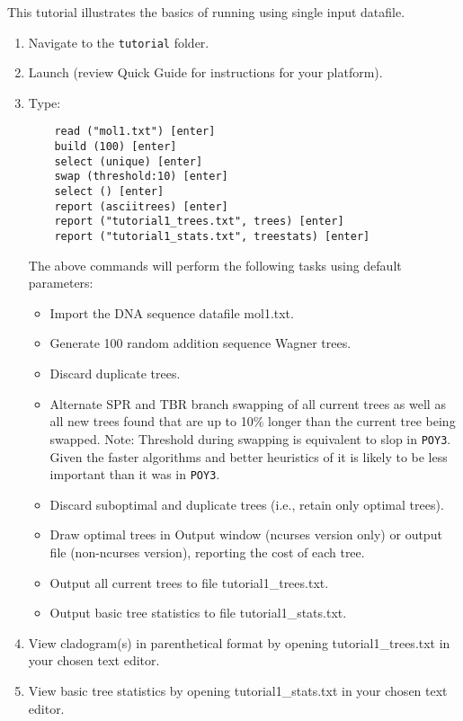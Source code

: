 This tutorial illustrates the basics of running \poy using single input datafile. 
\begin{enumerate}
\item Navigate to the \texttt{tutorial} folder. 
\item Launch \poy (review \poy Quick Guide for instructions for your platform).
\item Type:

    \begin{verbatim}
    read ("mol1.txt") [enter]
    build (100) [enter]
    select (unique) [enter]
    swap (threshold:10) [enter]
    select () [enter]
    report (asciitrees) [enter]
    report ("tutorial1_trees.txt", trees) [enter]
    report ("tutorial1_stats.txt", treestats) [enter]
    \end{verbatim}

The above commands will perform the following tasks using default parameters:
\begin{itemize}
\item  Import the DNA sequence datafile mol1.txt.
\item  Generate 100 random addition sequence Wagner trees.
\item  Discard duplicate trees.
\item  Alternate SPR and TBR branch swapping of all current trees as well as all 
new trees found that are up to 10\%
longer than the current tree being 
swapped. Note: Threshold during swapping is equivalent to slop in \texttt{POY3}. 
Given the faster algorithms and better heuristics of \poy it is likely to 
be less important than it was in \texttt{POY3}.
\item  Discard suboptimal and duplicate trees (i.e., retain only optimal trees).
\item  Draw optimal trees in \poy Output window (ncurses version only) or output 
file (non-ncurses version), reporting the cost of each tree.
\item  Output all current trees to file tutorial1\_trees.txt.
\item  Output basic tree statistics to file tutorial1\_stats.txt.
\end{itemize}

\item View cladogram(s) in parenthetical format by opening tutorial1\_trees.txt in 
your chosen text editor.
\item View basic tree statistics by opening tutorial1\_stats.txt in your chosen 
text editor.
\end{enumerate}

